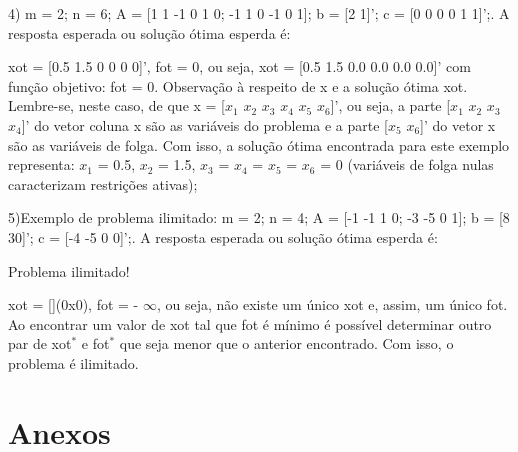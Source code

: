 \documentclass[10pt]{article}
\begin{document}
4) m = 2; n = 6; A = [1 1 -1 0 1 0; -1 1 0 -1 0 1]; b = [2 1]'; c = [0 0 0 0 1 1]';. A resposta esperada ou solução ótima esperda é:
\newline

xot = [0.5 1.5 0 0 0 0]', fot = 0, ou seja, xot = [0.5 1.5 0.0 0.0 0.0 0.0]' com função objetivo: fot = 0.
\newline
Observação à respeito de x e a solução ótima xot. Lembre-se, neste caso, de que x = [$x_1$ $x_2$ $x_3$ $x_4$ $x_5$ $x_6$]', ou seja, a parte [$x_1$ $x_2$ $x_3$ $x_4$]' do vetor coluna x são as variáveis do problema e a parte [$x_5$ $x_6$]' do vetor x são as variáveis de folga. Com isso, a solução ótima encontrada para este exemplo representa: $x_1$ = 0.5, $x_2$ = 1.5, $x_3$ = $x_4$ = $x_5$ = $x_6$ = 0 (variáveis de folga nulas caracterizam restrições ativas);
\newline

5)Exemplo de problema ilimitado: m = 2; n = 4; A = [-1 -1 1 0; -3 -5 0 1]; b = [8 30]'; c = [-4 -5 0 0]';. A resposta esperada ou solução ótima esperda é:
\newline

Problema ilimitado!
\newline

xot = [](0x0), fot = - $\infty$, ou seja, não existe um único xot e, assim, um único fot. Ao encontrar um valor de xot tal que fot é mínimo é possível determinar outro par de xot$^{*}$ e fot$^{*}$ que seja menor que o anterior encontrado. Com isso, o problema é ilimitado.

\section{Anexos}
\end{document}

